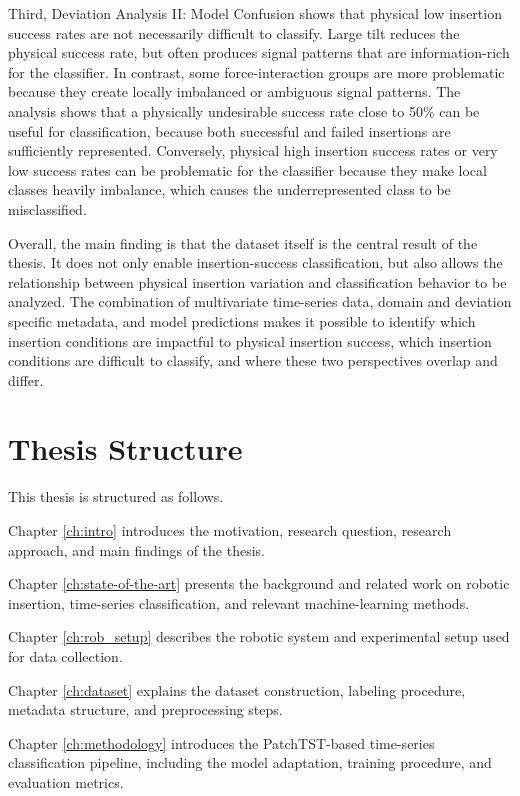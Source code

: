 Third, Deviation Analysis II: Model Confusion shows that physical low insertion success rates are not necessarily difficult to classify. Large tilt reduces the physical success rate, but often produces signal patterns that are information-rich for the classifier. In contrast, some force-interaction groups are more problematic because they create locally imbalanced or ambiguous signal patterns. The analysis shows that a physically undesirable success rate close to 50\% can be useful for classification, because both successful and failed insertions are sufficiently represented. Conversely, physical high insertion success rates or very low success rates can be problematic for the classifier because they make local classes heavily imbalance, which causes the underrepresented class to be misclassified.

Overall, the main finding is that the dataset itself is the central result of the thesis. It does not only enable insertion-success classification, but also allows the relationship between physical insertion variation and classification behavior to be analyzed. The combination of multivariate time-series data, domain and deviation specific metadata, and model predictions makes it possible to identify which insertion conditions are impactful to physical insertion success, which insertion conditions are difficult to classify, and where these two perspectives overlap and differ.


\section{Thesis Structure}
\label{sec:thesis_structure}

This thesis is structured as follows. 

Chapter \ref{ch:intro} introduces the motivation, research question, research approach, and main findings of the thesis.

Chapter \ref{ch:state-of-the-art} presents the background and related work on robotic insertion, time-series classification, and relevant machine-learning methods.

Chapter \ref{ch:rob_setup} describes the robotic system and experimental setup used for data collection.

Chapter \ref{ch:dataset} explains the dataset construction, labeling procedure, metadata structure, and preprocessing steps.

Chapter \ref{ch:methodology} introduces the PatchTST-based time-series classification pipeline, including the model adaptation, training procedure, and evaluation metrics.

